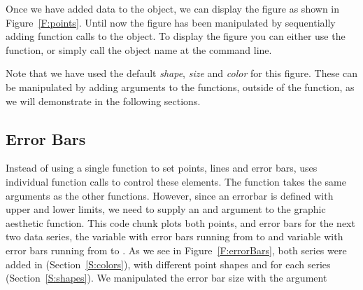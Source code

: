 \documentclass[nojss]{jss}\usepackage[]{graphicx}\usepackage[]{color}
\begin{document}
Once we have added data to the  object, we can display the figure as shown in Figure~\ref{F:points}. Until now the figure has been manipulated by sequentially adding function calls to the  object. To display the figure you can either use the  function, or simply call the object name at the command line.

Note that we have used the default \emph{shape}, \emph{size} and \emph{color} for this figure. These can be manipulated by adding arguments to the  functions, outside of the  function, as we will demonstrate in the following sections.

\subsection{Error Bars}\label{S:errorbars}

Instead of using a single function to set points, lines and error bars,  uses individual function calls to control these elements. The  function takes the same arguments as the other  functions. However, since an errorbar is defined with upper and lower limits, we need to supply an  and  argument to the graphic aesthetic function. This code chunk plots both points, and error bars for the next two data series, the  variable with error bars running from  to  and  variable with error bars running from  to . As we see in Figure~\ref{F:errorBars}, both series were added in  (Section~\ref{S:colors}), with different point shapes  and  for each series (Section~\ref{S:shapes}). We manipulated the error bar size with the  argument
\end{document}
